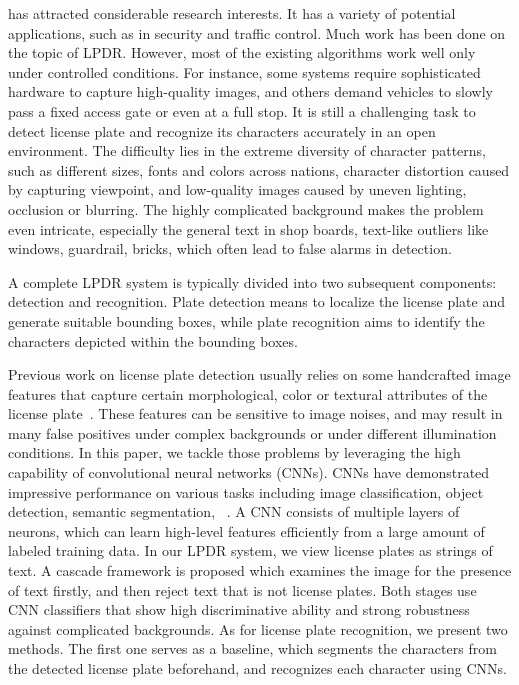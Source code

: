\documentclass[twocolumn]{svjour3}
\begin{document}
has attracted considerable research interests.
It has a variety of potential applications, such as in security and traffic control.
Much work has been done on the topic of LPDR.
However, most of the existing algorithms work well only under controlled conditions.
For instance, some systems require sophisticated hardware to capture high-quality images,
and others demand vehicles to slowly pass a fixed access gate   or even at a full stop.
It is still a challenging task
to detect license plate and recognize its characters accurately in an open environment.
The difficulty lies in the extreme diversity of character patterns, such as different sizes,
fonts and colors across nations, character distortion caused by capturing viewpoint,
and low-quality images caused by uneven lighting, occlusion or blurring.
The highly complicated background makes the problem even intricate,
especially the general text in shop boards, text-like outliers like windows, guardrail, bricks, which often lead to false alarms in detection.


A complete LPDR system is typically divided into two subsequent components:
detection and recognition. Plate detection means to localize the license plate and generate suitable
bounding boxes, while plate recognition aims to identify the characters depicted within the  b\-oun\-d\-ing
boxes.

Previous work on license plate detection usually relies
on some hand\-crafted image features that capture certain morphological,
color or textural attributes of the license plate~\cite{Du2013Automatic,Cnagnost2008}.
These features can be sensitive to image noises, and may result in many
false positives under complex backgrounds or under different illumination conditions.
In this paper, we tackle those problems by leveraging the high capability of convolutional neural networks (CNNs).
CNNs have demonstrated impressive performance on various tasks including image classification, object detection,
semantic segmentation, \etc~\cite{Ross2014}. A CNN consists of multiple layers of  neurons,
which can learn high-level features efficiently from a large amount of labeled training data.
In our LPDR system, we view license plates as strings of text.
A cascade framework is proposed which examines the image for the presence of text firstly,
and then reject text that is not license plates. Both stages use
CNN classifiers that show high discriminative ability and strong robustness against complicated backgrounds.
As for license plate recognition, we present two methods.
The first one serves as a baseline, which
segments the characters from the detected license plate beforehand,
and recognizes each character using CNNs.
\end{document}

